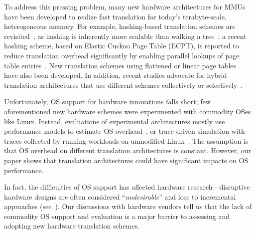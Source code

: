 To address this pressing problem,
	many new hardware architectures for MMUs have been developed to realize fast translation
	for today's terabyte-scale, heterogeneous memory.
For example, hashing-based translation schemes are 
	revisited~\cite{gosakan2023mosaic,jovan2022nestedecpt,skarlatos2020ecpt,jovan2023memory,yaniv2016hash,vmware2021hashing,Kwon24},
	as hashing is inherently more scalable than walking a tree~\cite{yaniv2016hash};
a recent hashing scheme, based on Elastic Cuckoo Page Table (ECPT), 
	is reported to reduce translation overhead significantly 
	by enabling parallel lookups of page table entries~\cite{skarlatos2020ecpt,jovan2022nestedecpt}.
New translation schemes using flattened or linear page tables~\cite{park2022fpt,karakostas2015redundant} have also been developed.
In addition, recent studies advocate for hybrid translation architectures
	that use different schemes collectively or selectively~\cite{alam2017doityourself,ahn2012revisiting,hoang2010nested,ghose2019pim,kanellopoulos2023utopia,self:dmt}.


Unfortunately, OS support for hardware innovations falls short;
	few aforementioned new hardware schemes were
	experimented with commodity OSes like Linux. %
Instead, evaluations of experimental architectures mostly use
	performance models to estimate OS overhead~\cite{self:dmt,margaritov2019asap,yaniv2016hash,karakostas2015redundant,alverti2020enhancing,ryoo2017rethinking},
	or trace-driven simulation with traces 
	collected by running workloads on unmodified Linux~\cite{skarlatos2020ecpt,ryoo2017rethinking,yaniv2016hash,margaritov2019asap}.
The assumption is that OS overhead 
	on different translation architectures is constant.
However, our paper shows that translation architectures
	could have significant impacts on OS performance.

In fact, the difficulties of OS support has affected hardware research---disruptive 
	hardware designs are often considered ``{\it undesirable}'' and lose to incremental approaches (see~\cite{margaritov2019asap}).
Our discussions with hardware vendors 
	tell us that the lack of commodity OS support and evaluation is a major barrier
	to assessing and adopting new hardware translation schemes.

